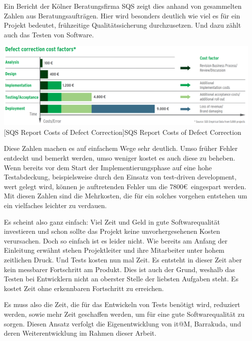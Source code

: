 \documentclass[12pt,a4paper,bibliography=totocnumbered,listof=totocnumbered]{scrartcl}
\begin{document}
Ein Bericht der Kölner Beratungsfirma SQS zeigt dies anhand von gesammelten Zahlen aus Beratungsaufträgen. Hier wird besonders deutlich wie viel es für ein Projekt bedeutet, frühzeitige Qualitätssicherung durchzusetzen. Und dazu zählt auch das Testen von Software.

\vspace{1em}
\begin{minipage}{\linewidth}
	\centering
	\includegraphics[width=0.9\linewidth]{images/img_sqs-defect-correction.PNG}
	[SQS Report Costs of Defect Correction]{SQS Report Costs of Defect Correction \footnotemark}
	\label{fig:img_sqs-defect-correction}
\end{minipage}

Diese Zahlen machen es auf einfachem Wege sehr deutlich. Umso früher Fehler entdeckt und bemerkt werden, umso weniger kostet es auch diese zu beheben. Wenn bereits vor dem Start der Implementierungsphase auf eine hohe Testabdeckung, beispielsweise durch den Einsatz von test-driven development, wert gelegt wird, können je auftretenden Fehler um die 7800\euro\ eingespart werden. Mit diesen Zahlen sind die Mehrkosten, die für ein solches vorgehen entstehen um ein vielfaches leichter zu verdauen.

Es scheint also ganz einfach: Viel Zeit und Geld in gute Softwarequalität investieren und schon sollte das Projekt keine unvorhergesehenen Kosten verursachen. Doch so einfach ist es leider nicht.
Wie bereits am Anfang der Einleitung erwähnt stehen Projektleiter und ihre Mitarbeiter unter hohem zeitlichen Druck. Und Tests kosten nun mal Zeit. Es entsteht in dieser Zeit aber kein messbarer Fortschritt am Produkt. Dies ist auch der Grund, weshalb das Testen bei Entwicklern nicht an oberster Stelle der liebsten Aufgaben steht. Es kostet Zeit ohne erkennbaren Fortschritt zu erreichen.

Es muss also die Zeit, die für das Entwickeln von Tests benötigt wird, reduziert werden, sowie mehr Zeit geschaffen werden, um für eine gute Softwarequalität zu sorgen. Diesen Ansatz verfolgt die Eigenentwicklung von it@M, Barrakuda, und deren Weiterentwicklung im Rahmen dieser Arbeit.
\end{document}
